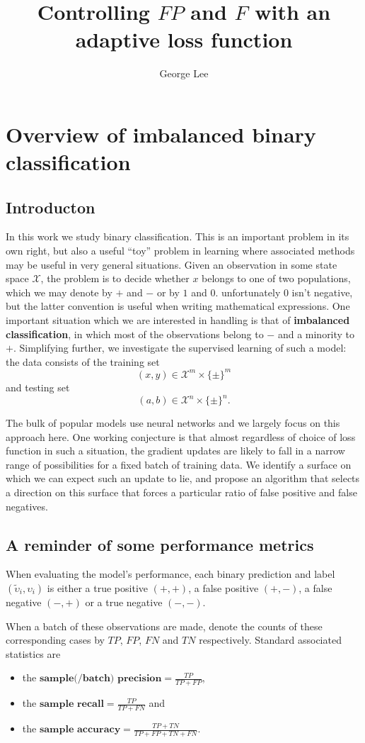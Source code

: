 \documentclass[10pt,a4paper]{article}
\title{Controlling $FP$ and $F$ with an adaptive loss function}
\author{George Lee}
\begin{document}
\maketitle
\section{Overview of imbalanced binary classification}
\subsection{Introducton}
In this work we study binary classification.
This is an important problem in its own right, but also a useful ``toy'' problem in learning where associated methods may be useful in very general situations.
Given an observation in some state space $\mathcal X$, the problem is to decide whether $x$ belongs to one of two populations, which we may denote by $+$ and $-$ or by $1$ and $0$.
unfortunately 0 isn't negative, but the latter convention is useful when writing mathematical expressions.
One important situation which we are interested in handling is that of \textbf{imbalanced classification}, in which most of the observations belong to $-$ and a minority to $+$.
Simplifying further, we investigate the supervised learning of such a model: the data consists of the training set
$$
(x,y)\in\mathcal X^m\times\{\pm\}^m
$$
and testing set
$$
(a,b)\in\mathcal X^n\times\{\pm\}^n.
$$

The bulk of popular models use neural networks and we largely focus on this approach here.
One working conjecture is that almost regardless of choice of loss function in such a situation, the gradient updates are likely to fall in a narrow range of possibilities for a fixed batch of training data.
We identify a surface on which we can expect such an update to lie, and propose an algorithm that selects a direction on this surface that forces a particular ratio of false positive and false negatives.
\subsection{A reminder of some performance metrics}
When evaluating the model's performance, each binary prediction and label $(\widetilde\upsilon_i,\upsilon_i)$ is either a true positive $(+,+)$, a false positive $(+,-)$, a false negative $(-,+)$ or a true negative $(-,-)$.

When a batch of these observations are made, denote the counts of these corresponding cases by $TP$, $FP$, $FN$ and $TN$ respectively.
Standard associated statistics are
\begin{itemize}
  \item the $\textbf{sample(/batch) precision}=\frac{TP}{TP+FP}$,
  \item the $\textbf{sample recall}=\frac{TP}{TP+FN}$ and
  \item the $\textbf{sample accuracy}=\frac{TP+TN}{TP+FP+TN+FN}$.
\end{itemize}
\end{document}
